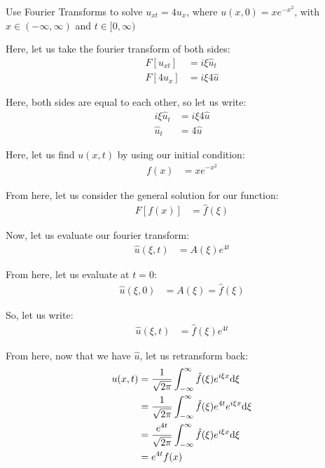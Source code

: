 Use Fourier Transforms to solve $u_{xt} = 4u_x$, where $u(x, 0) = xe^{-x^2}$, with $x \in (-\infty, \infty)$ and $t \in [0, \infty)$

Here, let us take the fourier transform of both sides:
%
\begin{align}
  F[u_{xt}] & = i \xi \hat u_t\\
  F[4u_x] & = i \xi 4 \hat u
\end{align}

Here, both sides are equal to each other, so let us write:
%
\begin{align}
  i \xi \hat u_t & = i \xi 4 \hat u\\
  \hat u_t & = 4 \hat u
\end{align}

Here, let us find $u(x, t)$ by using our initial condition:
%
\begin{align}
  f(x) & = xe^{-x^2}
\end{align}

From here, let us consider the general solution for our function:
%
\begin{align}
  F[f(x)] & = \hat f(\xi)
\end{align}

Now, let us evaluate our fourier transform:
%
\begin{align}
  \hat u(\xi, t) & = A(\xi) e^{4t}
\end{align}

From here, let us evaluate at $t = 0$:
%
\begin{align}
  \hat u(\xi, 0) & = A(\xi) = \hat f(\xi)
\end{align}

So, let us write:
%
\begin{align}
  \hat u(\xi, t) & = \hat f(\xi) e^{4t}
\end{align}

From here, now that we have $\hat u$, let us retransform back:
%
\begin{align}
  u(x, t)
  & = \frac{1}{\sqrt{2 \pi}} \int^\infty_{-\infty} \hat f(\xi) e^{i \xi x} \text d \xi\\
  & = \frac{1}{\sqrt{2 \pi}} \int^\infty_{-\infty} \hat f(\xi)e^{4t} e^{i \xi x} \text d \xi\\
  & = \frac{e^{4t}}{\sqrt{2 \pi}} \int^\infty_{-\infty} \hat f(\xi) e^{i \xi x} \text d \xi\\
  & = e^{4t} f(x)
\end{align}
